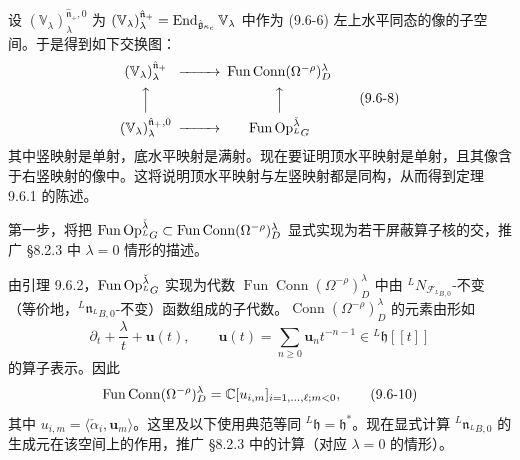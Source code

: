 设 $(\mathbb{V}_\lambda)^{\hat{\mathfrak{n}}_+,0}_\lambda$ 为 $(\mathbb{V}_\lambda)^{\hat{\mathfrak{n}}_+}_\lambda=\operatorname{End}_{\hat{\mathfrak{g}}_{\kappa_c}}\mathbb{V}_\lambda$ 中作为 (9.6-6) 左上水平同态的像的子空间。于是得到如下交换图：
\begin{equation}
    \begin{CD}
        (\mathbb{V}_\lambda)^{\hat{\mathfrak{n}}_+}_\lambda @>>>
            \operatorname{Fun}\operatorname{Conn}(\Omega^{-\rho})^\lambda_D\\
        @AAA @AAA\\
        (\mathbb{V}_\lambda)^{\hat{\mathfrak{n}}_+,0}_\lambda @>>>
            \operatorname{Fun}\Op^{\check\lambda}_{{}^LG}
    \end{CD}
    \tag{9.6-8}
\end{equation}
其中竖映射是单射，底水平映射是满射。现在要证明顶水平映射是单射，且其像含于右竖映射的像中。这将说明顶水平映射与左竖映射都是同构，从而得到定理 9.6.1 的陈述。


第一步，将把 $\operatorname{Fun}\operatorname{Op}^{\check\lambda}_{{}^LG}\subset\operatorname{Fun}\operatorname{Conn}(\Omega^{-\rho})^\lambda_D$ 显式实现为若干屏蔽算子核的交，推广 §8.2.3 中 $\lambda=0$ 情形的描述。

由引理 9.6.2，$\operatorname{Fun}\operatorname{Op}^{\check\lambda}_{{}^LG}$ 实现为代数 $\operatorname{Fun}\operatorname{Conn}(\Omega^{-\rho})^\lambda_D$ 中由 ${}^LN_{\mathcal{F}_{{}^LB,0}}$-不变（等价地，${}^L\mathfrak{n}_{{}^LB,0}$-不变）函数组成的子代数。$\operatorname{Conn}(\Omega^{-\rho})^\lambda_D$ 的元素由形如
\begin{equation}
    \partial_t+\frac{\lambda}{t}+\mathbf{u}(t),
    \qquad
    \mathbf{u}(t)=\sum_{n\ge0}\mathbf{u}_nt^{-n-1}\in{}^L\mathfrak{h}[[t]]
    \tag{9.6-9}
\end{equation}
的算子表示。因此
\begin{equation}
    \operatorname{Fun}\operatorname{Conn}(\Omega^{-\rho})^\lambda_D
    =\mathbb{C}[u_{i,m}]_{i=1,\dots,\ell;m<0},
    \tag{9.6-10}
\end{equation}
其中 $u_{i,m}=\langle\check\alpha_i,\mathbf{u}_m\rangle$。这里及以下使用典范等同 ${}^L\mathfrak{h}=\mathfrak{h}^*$。现在显式计算 ${}^L\mathfrak{n}_{{}^LB,0}$ 的生成元在该空间上的作用，推广 §8.2.3 中的计算（对应 $\lambda=0$ 的情形）。


